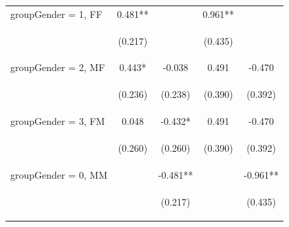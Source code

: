 \documentclass{article} %
\begin{document}
\begin{table}[H]
\begin{center}
\begin{tabular}{lcccc}
groupGender = 1, FF & 0.481** &  & 0.961** &  \\
\vspace{4pt} & \begin{footnotesize}(0.217)\end{footnotesize} & \begin{footnotesize}\end{footnotesize} & \begin{footnotesize}(0.435)\end{footnotesize} & \begin{footnotesize}\end{footnotesize} \\
groupGender = 2, MF & 0.443* & -0.038 & 0.491 & -0.470 \\
\vspace{4pt} & \begin{footnotesize}(0.236)\end{footnotesize} & \begin{footnotesize}(0.238)\end{footnotesize} & \begin{footnotesize}(0.390)\end{footnotesize} & \begin{footnotesize}(0.392)\end{footnotesize} \\
groupGender = 3, FM & 0.048 & -0.432* & 0.491 & -0.470 \\
\vspace{4pt} & \begin{footnotesize}(0.260)\end{footnotesize} & \begin{footnotesize}(0.260)\end{footnotesize} & \begin{footnotesize}(0.390)\end{footnotesize} & \begin{footnotesize}(0.392)\end{footnotesize} \\
groupGender = 0, MM &  & -0.481** &  & -0.961** \\
\vspace{4pt} & \begin{footnotesize}\end{footnotesize} & \begin{footnotesize}(0.217)\end{footnotesize} & \begin{footnotesize}\end{footnotesize} & \begin{footnotesize}(0.435)\end{footnotesize} \\

\end{tabular}
\end{center}
\end{table}
\end{document}
